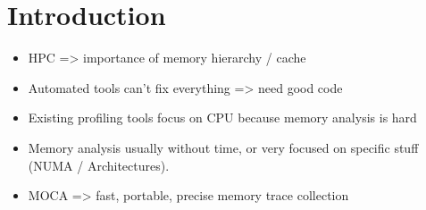 \section{Introduction}
\label{sec:intro}

\begin{itemize}
    \item HPC => importance of memory hierarchy / cache
    \item Automated tools can't fix everything => need good code
    \item Existing profiling tools focus on CPU because memory analysis is
        hard
    \item Memory analysis usually without time, or very focused on specific
        stuff (NUMA / Architectures).
    \item MOCA => fast, portable, precise memory trace collection
\end{itemize}
